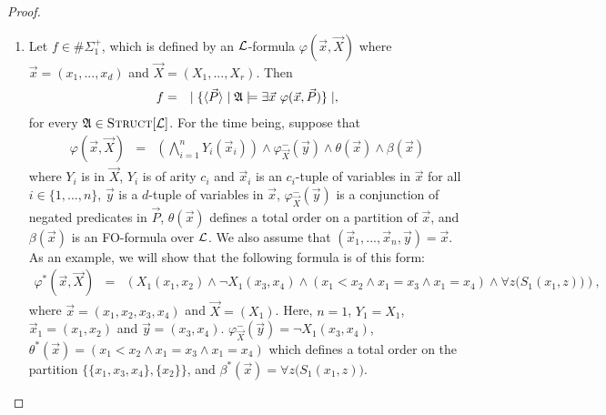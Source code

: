 \documentclass[12pt]{article}
\def\A{{\frak A}}
\def\L{{\cal L}}
\def\P{\vec{P}}
\def\X{\vec{X}}
\def\x{\vec{x}}
\def\y{\vec{y}}
\begin{document}
\begin{proof}
\begin{enumerate}
\item Let $f \in \#\Sigma_1^+$, which is defined by an $\L$-formula $\varphi(\x,\X)$ where $\x = (x_1,...,x_d)$ and $\X = (X_1,...,X_r)$. Then
\begin{eqnarray*}
f &=& \mid \{ \langle\P\rangle \mid \A \models \exists \x \ \varphi(\x,\P) \} \mid,
\end{eqnarray*}
for every $\A \in \textsc{Struct}[\L]$. For the time being, suppose that
\begin{eqnarray*}
\varphi(\x,\X) &=& \left( \bigwedge_{i=1}^n Y_i(\x_i) \right) \wedge \varphi_{\X}^{-}(\y) \wedge \theta(\x) \wedge \beta(\x)
\end{eqnarray*}
where $Y_i$ is in $\X$, $Y_i$ is of arity $c_i$ and $\x_i$ is an $c_i$-tuple of variables in $\x$ for all $i \in \{1,...,n\}$, $\y$ is a $d$-tuple of variables in $\x$, $\varphi_{\X}^{-}(\y)$ is a conjunction of negated predicates in $\P$, $\theta(\x)$ defines a total order on a partition of $\x$, and $\beta(\x)$ is an FO-formula over $\L$. We also assume that $(\x_1,...,\x_n,\y) = \x$. As an example, we will show that the following formula is of this form:
\begin{eqnarray*}
\varphi^{*}(\x,\X) &=& \left( X_1(x_1,x_2) \wedge \neg X_1(x_3,x_4) \wedge (x_1 < x_2 \wedge x_1 = x_3 \wedge x_1 = x_4 ) \wedge \forall z\big( S_1(x_1,z) \big) \right),
\end{eqnarray*}
where $\x = (x_1,x_2,x_3,x_4)$ and $\X = (X_1)$. Here, $n = 1$, $Y_1 = X_1$, $\x_1 = (x_1,x_2)$ and $\y = (x_3,x_4)$. $\varphi_{\X}^{-}(\y) = \neg X_1(x_3,x_4)$, $\theta^*(\x) = (x_1 < x_2 \wedge x_1 = x_3 \wedge x_1 = x_4)$ which defines a total order on the partition $\{\{x_1,x_3,x_4\},\{x_2\}\}$, and $\beta^*(\x) = \forall z\big( S_1(x_1,z) \big)$.


\end{enumerate}
\end{proof}
\end{document}
